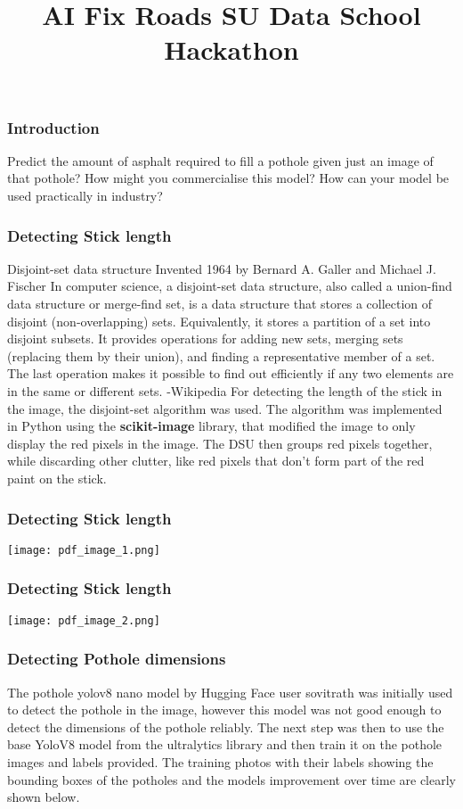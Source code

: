 \documentclass{beamer}
\title{AI Fix Roads SU Data School Hackathon}
\author[Trivial Matters Inc.]{\textbf {Jan Dalhuysen \and Hugo Bruwer \and Nathan Sparg \and Dannike Zietsman \and Joseph Carmody}}
\date{}
\begin{document}
\frame{\titlepage}

\begin{frame}
\frametitle{Introduction}
Predict the amount of asphalt required to fill a pothole given just an image of that pothole?
How might you commercialise this model? How can your model be used practically in industry?
\end{frame}

\begin{frame}
\frametitle{Detecting Stick length}
Disjoint-set data structure
Invented 1964 by Bernard A. Galler and Michael J. Fischer
In computer science, a disjoint-set data structure, also called a union-find data structure or merge-find set, is a data structure that stores a collection of disjoint (non-overlapping) sets. Equivalently, it stores a partition of a set into disjoint subsets. It provides operations for adding new sets, merging sets (replacing them by their union), and finding a representative member of a set. The last operation makes it possible to find out efficiently if any two elements are in the same or different sets. -Wikipedia
For detecting the length of the stick in the image, the disjoint-set algorithm was used. The algorithm was implemented in Python using the \textbf{scikit-image} library, that modified the image to only display the red pixels in the image. The DSU then groups red pixels together, while discarding other clutter, like red pixels that don't form part of the red paint on the stick.
\end{frame}

\begin{frame}
\frametitle{Detecting Stick length}
\begin{center}
\texttt{[image: pdf\_image\_1.png]}
\end{center}
\end{frame}

\begin{frame}
\frametitle{Detecting Stick length}
\begin{center}
\texttt{[image: pdf\_image\_2.png]}
\end{center}
\end{frame}

\begin{frame}
\frametitle{Detecting Pothole dimensions}
The pothole yolov8 nano model by Hugging Face user sovitrath was initially used to detect the pothole in the image, however this model was not good enough to detect the dimensions of the pothole reliably.
The next step was then to use the base YoloV8 model from the ultralytics library and then train it on the pothole images and labels provided.
The training photos with their labels showing the bounding boxes of the potholes and the models improvement over time are clearly shown below.
\end{frame}
\end{document}
